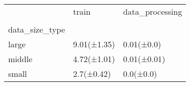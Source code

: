 \begin{tabular}{lll}
\toprule
{} &        train & data\_processing \\
{} \\
data\_size\_type &              &                 \\
\midrule
large          &  9.01(±1.35) &      0.01(±0.0) \\
middle         &  4.72(±1.01) &     0.01(±0.01) \\
small          &   2.7(±0.42) &       0.0(±0.0) \\
\bottomrule
\end{tabular}
